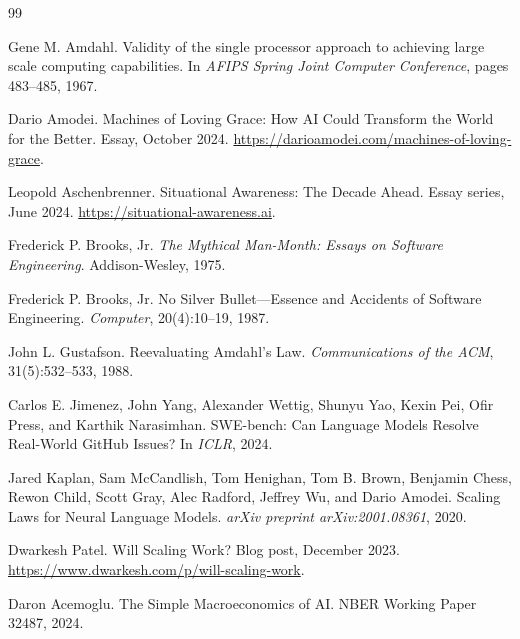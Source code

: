 \documentclass[11pt,a4paper]{article}
\begin{document}

\begin{thebibliography}{99}

Gene M. Amdahl.
\newblock Validity of the single processor approach to achieving large scale computing capabilities.
\newblock In \emph{AFIPS Spring Joint Computer Conference}, pages 483--485, 1967.

Dario Amodei.
\newblock Machines of Loving Grace: How AI Could Transform the World for the Better.
\newblock Essay, October 2024.
\newblock \url{https://darioamodei.com/machines-of-loving-grace}.

Leopold Aschenbrenner.
\newblock Situational Awareness: The Decade Ahead.
\newblock Essay series, June 2024.
\newblock \url{https://situational-awareness.ai}.

Frederick P. Brooks, Jr.
\newblock \emph{The Mythical Man-Month: Essays on Software Engineering}.
\newblock Addison-Wesley, 1975.

Frederick P. Brooks, Jr.
\newblock No Silver Bullet---Essence and Accidents of Software Engineering.
\newblock \emph{Computer}, 20(4):10--19, 1987.

John L. Gustafson.
\newblock Reevaluating Amdahl's Law.
\newblock \emph{Communications of the ACM}, 31(5):532--533, 1988.

Carlos E. Jimenez, John Yang, Alexander Wettig, Shunyu Yao, Kexin Pei, Ofir Press, and Karthik Narasimhan.
\newblock SWE-bench: Can Language Models Resolve Real-World GitHub Issues?
\newblock In \emph{ICLR}, 2024.

Jared Kaplan, Sam McCandlish, Tom Henighan, Tom B. Brown, Benjamin Chess, Rewon Child, Scott Gray, Alec Radford, Jeffrey Wu, and Dario Amodei.
\newblock Scaling Laws for Neural Language Models.
\newblock \emph{arXiv preprint arXiv:2001.08361}, 2020.

Dwarkesh Patel.
\newblock Will Scaling Work?
\newblock Blog post, December 2023.
\newblock \url{https://www.dwarkesh.com/p/will-scaling-work}.

Daron Acemoglu.
\newblock The Simple Macroeconomics of AI.
\newblock NBER Working Paper 32487, 2024.


\end{thebibliography}
\end{document}
